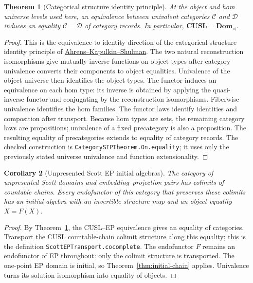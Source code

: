 \documentclass[11pt,a4paper]{article}
\newtheorem{theorem}{Theorem}[section]
\newtheorem{corollary}[theorem]{Corollary}
\theoremstyle{definition}
\theoremstyle{remark}
\begin{document}
\begin{theorem}[Categorical structure identity principle]
\label{thm:category-sip}
At the object and hom universe levels used here, an equivalence between
univalent categories $\mathcal C$ and $\mathcal D$ induces an equality
$\mathcal C=\mathcal D$ of category records. In particular,
$\mathbf{CUSL}=\mathbf{Dom}_{\triangleleft}$.
\end{theorem}
\begin{proof}
This is the equivalence-to-identity direction of the categorical
structure identity principle of
\href{https://arxiv.org/abs/1303.0584}{Ahrens--Kapulkin--Shulman}.
The two natural reconstruction isomorphisms give mutually inverse
functions on object types after category univalence converts their
components to object equalities. Univalence of the object universe then
identifies the object types. The functor induces an equivalence on each
hom type: its inverse is obtained by applying the quasi-inverse functor
and conjugating by the reconstruction isomorphisms. Fiberwise univalence
identifies the hom families. The functor laws identify identities and
composition after transport. Because hom types are sets, the remaining
category laws are propositions; univalence of a fixed precategory is
also a proposition. The resulting equality of precategories extends to
equality of category records. The checked construction is
\texttt{CategorySIPTheorem.On.equality}; it uses only the previously
stated universe univalence and function extensionality.
\end{proof}

\begin{corollary}[Unpresented Scott EP initial algebras]
\label{cor:ep-initial}
The category of unpresented Scott domains and embedding--projection pairs
has colimits of countable chains. Every endofunctor of this category that
preserves these colimits has an initial algebra with an invertible
structure map and an object equality $X=F(X)$.
\end{corollary}
\begin{proof}
By Theorem~\ref{thm:category-sip}, the CUSL--EP equivalence gives an
equality of categories. Transport the CUSL countable-chain colimit
structure along this equality; this is the definition
\texttt{ScottEPTransport.cocomplete}. The endofunctor $F$ remains an
endofunctor of EP throughout: only the colimit structure is transported.
The one-point EP domain is initial, so
Theorem~\ref{thm:initial-chain} applies. Univalence turns its solution
isomorphism into equality of objects.
\end{proof}
\end{document}
